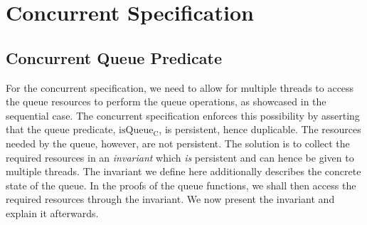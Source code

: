 \documentclass[a4paper, 10pt]{report}
\theoremstyle{definition}
\newcommand{\isqueueconc}{\operatorname{isQueue_{C}}}
\begin{document}
\section{Concurrent Specification}
\label{TLMSQSPECS:section:concurrent}

\subsection{Concurrent Queue Predicate}
\label{TLMSQSPECS:concurrent:sub:conc-queue-pred}

For the concurrent specification, we need to allow for multiple threads to access the queue resources to perform the queue operations, as showcased in the sequential case. The concurrent specification enforces this possibility by asserting that the queue predicate, $\isqueueconc$, is persistent, hence duplicable. The resources needed by the queue, however, are not persistent. The solution is to collect the required resources in an \textit{invariant} which \emph{is} persistent and can hence be given to multiple threads. The invariant we define here additionally describes the concrete state of the queue. In the proofs of the queue functions, we shall then access the required resources through the invariant. We now present the invariant and explain it afterwards.
\end{document}

